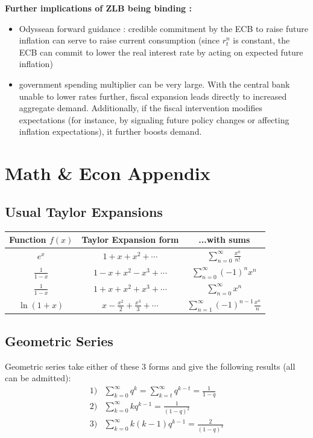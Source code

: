 \documentclass{article}
\begin{document}
 {\small  
 \textbf{Further implications of ZLB being binding :} {\scriptsize 
        \begin{itemize}
            \item Odyssean forward guidance : credible commitment by the ECB to raise future inflation can serve to raise current consumption (since $r_t^n$ is constant, the ECB can commit to lower the real interest rate by acting on expected future inflation)
            \item government spending multiplier can be very large. With the central bank unable to lower rates further, fiscal expansion leads directly to increased aggregate demand. Additionally, if the fiscal intervention modifies expectations (for instance, by signaling future policy changes or affecting inflation expectations), it further boosts demand.
    \end{itemize}}

\section{Math \& Econ Appendix}
\subsection{Usual Taylor Expansions}
\begin{tabular}{c|c|c}
\toprule
Function $f(x)$ & Taylor Expansion form & ...with sums \\ 
\midrule 
$e^x$ & $1 + x + x^2 + \cdots$ & $\sum_{n=0}^\infty\frac{x^n}{n!}$ \\ 
\midrule
$\frac{1}{1-x}$ & $1 - x + x^2 - x^3 + \cdots$ & $\sum_{n=0}^\infty (-1)^nx^n$ \\ 
\midrule
$\frac{1}{1-x}$ & $1 + x + x^2 + x^3 + \cdots$ & $\sum_{n=0}^\infty x^n$ \\ 
\midrule
$\ln(1+x)$ & $x - \frac{x^2}{2} + \frac{x^3}{3} + \cdots$ & $\sum_{n=1}^\infty(-1)^{n-1}\frac{x^n}{n}$ \\ 
\bottomrule
\end{tabular}
\subsection{Geometric Series}
Geometric series take either of these 3 forms and give the following results (all can be admitted): 
\begin{equation}
\begin{aligned}
    1)& \sum_{k=0}^\infty q^k = \sum_{k=t}^\infty q^{k-t} = \frac{1}{1-q} \\
    2)& \sum_{k=0}^\infty kq^{k-1} = \frac{1}{(1-q)^2} \\
    3)& \sum_{k=0}^\infty k(k-1)q^{k-1} = \frac{2}{(1-q)^3}
\end{aligned}
\end{equation}
}
\end{document}
